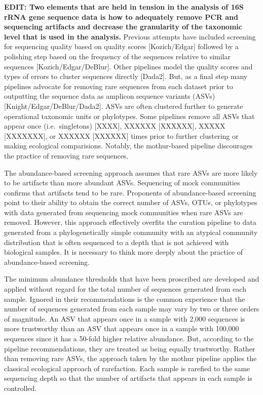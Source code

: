 \documentclass[]{article}
\begin{document}
\textbf{EDIT: Two elements that are held in tension in the analysis of
16S rRNA gene sequence data is how to adequately remove PCR and
sequencing artifacts and decrease the granularity of the taxonomic level
that is used in the analysis.} Previous attempts have included screening
for sequencing quality based on quality scores {[}Kozich/Edgar{]}
followed by a polishing step based on the frequency of the sequences
relative to similar sequences {[}Kozich/Edgar/DeBlur{]}. Other pipelines
model the quality scores and types of errors to cluster sequences
directly {[}Dada2{]}. But, as a final step many pipelines advocate for
removing rare sequences from each dataset prior to outputting the
sequence data as amplicon sequence variants (ASVs)
{[}Knight/Edgar/DeBlur/Dada2{]}. ASVs are often clustered further to
generate operational taxonomic units or phylotypes. Some pipelines
remove all ASVs that appear once (i.e.~singletons) {[}XXXX{]}, XXXXXX
{[}XXXXXX{]}, XXXXX {[}XXXXXXX{]}, or XXXXXX {[}XXXXXX{]} times prior to
further clustering or making ecological comparisions. Notably, the
mothur-based pipeline discourages the practice of removing rare
sequences.

The abundance-based screening approach assumes that rare ASVs are more
likely to be artifacts than more abundant ASVs. Sequencing of mock
communities confirms that artifacts tend to be rare. Proponents of
abundance-based screening point to their ability to obtain the correct
number of ASVs, OTUs, or phylotypes with data generated from sequencing
mock communities when rare ASVs are removed. However, this approach
effectively overfits the curation pipeline to data generated from a
phylogenetically simple community with an atypical community
distribution that is often sequenced to a depth that is not achieved
with biological samples. It is necessary to think more deeply about the
practice of abundance-based screening.

The minimum abundance thresholds that have been proscribed are developed
and applied without regard for the total number of sequences generated
from each sample. Ignored in their recommendations is the common
experience that the number of sequences generated from each sample may
vary by two or three orders of magnitude. An ASV that appears once in a
sample with 2,000 sequences is more trustworthy than an ASV that appears
once in a sample with 100,000 sequences since it has a 50-fold higher
relative abundance. But, according to the pipeline recommendations, they
are treated as being equally trustworthy. Rather than removing rare
ASVs, the approach taken by the mothur pipeline applies the classical
ecological approach of rarefaction. Each sample is rarefied to the same
sequencing depth so that the number of artifacts that appears in each
sample is controlled.
\end{document}
